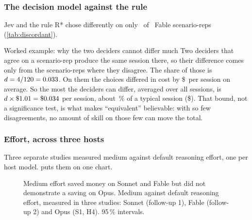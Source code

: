 \subsubsection{The decision model against the rule}\label{sec:bound}

Jev and the rule R* chose differently on only \DcN\ of \DcUnits\ Fable scenario-reps (\cref{tab:discordant}).

\begin{table}[htbp]
\centering\small
\caption{The \DcN\ S1 scenario-reps on which the decision model (Jev) and the rule R* chose different session
models, with what each choice cost and how it scored.}
\label{tab:discordant}

\end{table}

\begin{casecard}{Worked example: why the two deciders cannot differ much}
Two deciders that agree on a scenario-rep produce the same session there, so their difference comes only from the
scenario-reps where they disagree. The share of those is $d = 4/120 = 0.033$. On them the choices differed in
cost by \$\DcMeanAbsDiff\ per session on average. So the most the deciders can differ, averaged over all sessions, is
$d \times \$1.01 = \$0.034$ per session, about \DcBoundPct\,\% of a typical session (\$\DcMeanCost).
That bound, not a significance test, is what makes ``equivalent'' believable: with so few disagreements, no amount of
skill on those few can move the total.
\end{casecard}

\subsubsection{Effort, across three hosts}

Three separate studies measured medium against default reasoning effort, one per host model.  puts them on one chart.

\begin{figure}[htbp]
\centering
{}\par\smallskip

\caption{Medium effort saved money on Sonnet and Fable but did not demonstrate a saving on Opus. Medium against default reasoning effort, measured in three studies: Sonnet (follow-up 1), Fable (follow-up
2) and Opus (S1, H4). 95\,\% intervals.}
\label{fig:effort}
\end{figure}

